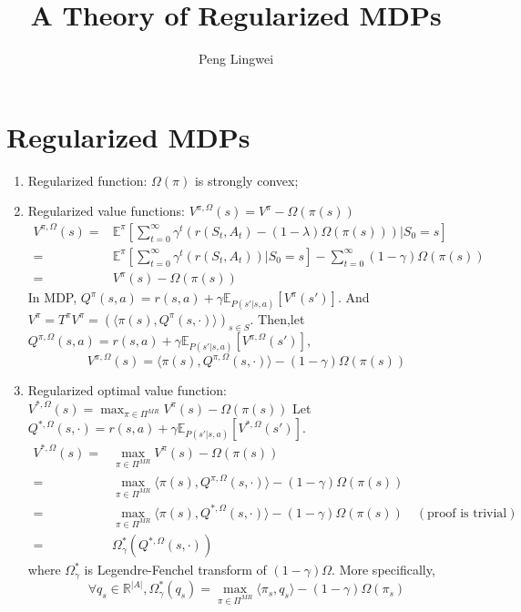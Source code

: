 \documentclass[a4paper]{article}
\title{A Theory of Regularized MDPs}
\author{Peng Lingwei}
\begin{document}
\maketitle
\tableofcontents
\newpage

\section{Regularized MDPs}%

\begin{enumerate}
    \item Regularized function: $ \Omega(\pi) $ is strongly convex;
    \item Regularized value functions: $ V^{\pi, \Omega}(s) = V^{\pi} - \Omega(\pi(s))$
        \begin{align*}
            V^{\pi, \Omega}(s) =& \mathbb{E}^{\pi}\left[ \sum^{\infty}_{t=0} \gamma^t (r(S_t, A_t) - (1-\lambda)\Omega(\pi(s))) \vert S_0 = s \right] \\
            =& \mathbb{E}^{\pi}\left[ \sum^{\infty}_{t=0} \gamma^t (r(S_t, A_t)) \vert S_0 = s \right] - \sum^{\infty}_{t=0} (1-\gamma) \Omega(\pi(s)) \\
            =& V^{\pi}(s) - \Omega(\pi(s))
        \end{align*}
        In MDP, $ Q^{\pi}(s,a) = r(s,a) + \gamma \mathbb{E}_{P(s'|s,a)}\left[ V^{\pi}(s') \right] $. And $ V^{\pi} = T^{\pi}V^{\pi} = {\left( \langle \pi(s), Q^{\pi}(s, \cdot) \rangle \right)}_{s \in S} $. 
        Then,let $ Q^{\pi, \Omega}(s,a) = r(s,a) + \gamma \mathbb{E}_{P(s'|s,a)}\left[ V^{\pi, \Omega}(s') \right] $,
        \[
            V^{\pi, \Omega}(s) = \langle \pi(s), Q^{\pi, \Omega}(s, \cdot) \rangle - (1-\gamma)\Omega(\pi(s))
        \]
    \item Regularized optimal value function: $ V^{*, \Omega}(s) = \max_{\pi \in \Pi^{MR}} V^{\pi}(s) - \Omega(\pi(s)) $
        Let $ Q^{*, \Omega}(s, \cdot) = r(s,a) + \gamma \mathbb{E}_{P(s'|s,a)}\left[ V^{*,\Omega}(s') \right] $.
        \begin{align*}
            V^{*, \Omega}(s) =& \max_{\pi \in \Pi^{MR}} V^{\pi}(s) - \Omega(\pi(s))\\
            =& \max_{\pi \in \Pi^{MR}} \langle \pi(s), Q^{\pi, \Omega}(s, \cdot) \rangle- (1 - \gamma)\Omega(\pi(s))\\
            =& \max_{\pi \in \Pi^{MR}} \langle \pi(s), Q^{*, \Omega}(s, \cdot) \rangle- (1 - \gamma)\Omega(\pi(s)) \quad (\text{proof is trivial})\\
            =& \Omega^{*}_{\gamma}(Q^{*,\Omega}(s,\cdot))
        \end{align*}
        where $ \Omega_{\gamma}^{*} $ is Legendre-Fenchel transform of $ (1-\gamma)\Omega $. More specifically,
        \[
            \forall q_s \in \mathbb{R}^{\left| A \right|}, \Omega_{\gamma}^{*}(q_s) 
            = \max_{\pi \in \Pi^{MR}} \langle \pi_s, q_s \rangle - (1- \gamma) \Omega(\pi_s)
        \]
        

\end{enumerate}
\end{document}
